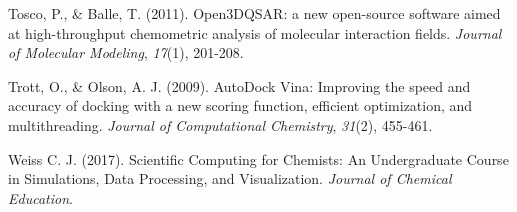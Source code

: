 \documentclass[10pt,letterpaper]{article}
\begin{document}
\begin{thebibliography}{99}
 Tosco, P., \& Balle, T. (2011).
 Open3DQSAR: a new open-source software aimed at high-throughput chemometric analysis of molecular interaction fields.
 \textit{Journal of Molecular Modeling},
 \textit{17}(1),
 201-208.

 Trott, O., \& Olson, A. J. (2009).
 AutoDock Vina: Improving the speed and accuracy of docking with a new scoring function, efficient optimization, and multithreading.
 \textit{Journal of Computational Chemistry},
 \textit{31}(2),
 455-461.

 Weiss C. J. (2017).
 Scientific Computing for Chemists: An Undergraduate Course in Simulations, Data Processing, and Visualization.
 \textit{Journal of Chemical Education}.

\end{thebibliography}
\end{document}
